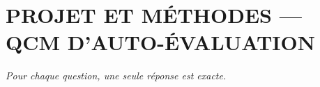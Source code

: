 
\section*{\textcolor{chapcolor}{\MakeUppercase{Projet et méthodes — QCM d'auto-évaluation}}}

\begin{center}
\textit{Pour chaque question, une seule réponse est exacte.}
\end{center}

